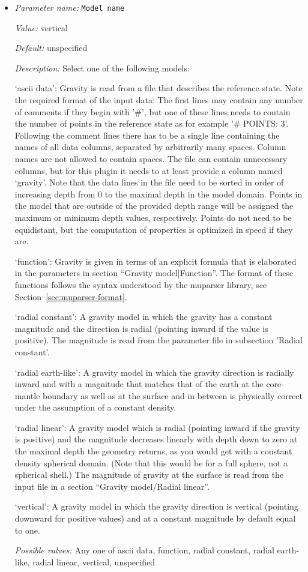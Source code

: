 \begin{itemize}
\item {\it Parameter name:} {\tt Model name}
\label{parameters:Gravity model/Model name}


{\it Value:} vertical


{\it Default:} unspecified


{\it Description:} Select one of the following models:

`ascii data': Gravity is read from a file that describes the reference state. Note the required format of the input data: The first lines may contain any number of comments if they begin with '\#', but one of these lines needs to contain the number of points in the reference state as for example '\# POINTS: 3'. Following the comment lines there has to be a single line containing the names of all data columns, separated by arbitrarily many spaces. Column names are not allowed to contain spaces. The file can contain unnecessary columns, but for this plugin it needs to at least provide a column named `gravity'. Note that the data lines in the file need to be sorted in order of increasing depth from 0 to the maximal depth in the model domain. Points in the model that are outside of the provided depth range will be assigned the maximum or minimum depth values, respectively. Points do not need to be equidistant, but the computation of properties is optimized in speed if they are.

`function': Gravity is given in terms of an explicit formula that is elaborated in the parameters in section ``Gravity model|Function''. The format of these functions follows the syntax understood by the muparser library, see Section~\ref{sec:muparser-format}.

`radial constant': A gravity model in which the gravity has a constant magnitude and the direction is radial (pointing inward if the value is positive). The magnitude is read from the parameter file in subsection 'Radial constant'.

`radial earth-like': A gravity model in which the gravity direction is radially inward and with a magnitude that matches that of the earth at the core-mantle boundary as well as at the surface and in between is physically correct under the assumption of a constant density.

`radial linear': A gravity model which is radial (pointing inward if the gravity is positive) and the magnitude decreases linearly with depth down to zero at the maximal depth the geometry returns, as you would get with a constant density spherical domain. (Note that this would be for a full sphere, not a spherical shell.) The magnitude of gravity at the surface is read from the input file in a section ``Gravity model/Radial linear''.

`vertical': A gravity model in which the gravity direction is vertical (pointing downward for positive values) and at a constant magnitude by default equal to one.


{\it Possible values:} Any one of ascii data, function, radial constant, radial earth-like, radial linear, vertical, unspecified
\end{itemize}
